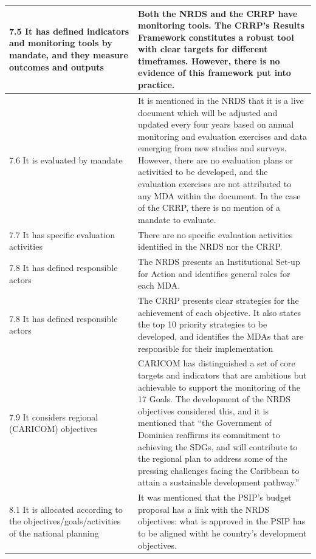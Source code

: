 \documentclass[
  10pt,
]{book}
\begin{document}
\begin{table}
\begin{tabular}[t]{l|l}
\hline
\hspace{1em}7.5 It has defined indicators and monitoring tools by mandate, and they measure outcomes and outputs & Both the NRDS and the CRRP have monitoring tools. The CRRP’s Results Framework constitutes a robust tool with clear targets for different timeframes. However, there is no evidence of  this framework put into practice.\\
\hline
\hspace{1em}7.6 It is evaluated by mandate & It is mentioned in the NRDS that it is a live document which will be adjusted and updated every four years based on annual monitoring and evaluation exercises and data emerging from new studies and surveys. However, there are no evaluation plans or activitied to be developed, and the evaluation exercises are not attributed to any MDA within the document. In the case of the CRRP, there is no mention of a mandate to evaluate.\\
\hline
\hspace{1em}7.7 It has specific evaluation activities & There are no specific evaluation activities identified in the NRDS nor the CRRP.\\
\hline
\hspace{1em}7.8 It has defined responsible actors & The NRDS presents an Institutional Set-up for Action and identifies general roles for each MDA.\\
\hline
7.8 It has defined responsible actors & The CRRP presents clear strategies for the achievement of each objective. It also states the top 10 priority strategies to be developed, and identifies the MDAs that are responsible for their implementation\\
\hline
7.9 It considers regional (CARICOM) objectives & CARICOM has distinguished a set of core targets and indicators that are ambitious but achievable to support the monitoring of the 17 Goals. The development of the NRDS objectives considered this, and it is mentioned that “the Government of Dominica reaffirms its commitment to achieving the SDGs, and will contribute to the regional plan to address some of the pressing challenges facing the Caribbean to attain a sustainable development pathway.”\\
\hline
8.1 It is allocated according to the objectives/goals/activities of the national planning & It was mentioned that the PSIP’s budget proposal has a link with the NRDS objectives: what is approved in the PSIP has to be aligned witht he country’s development objectives.\\

\end{tabular}
\end{table}
\end{document}
